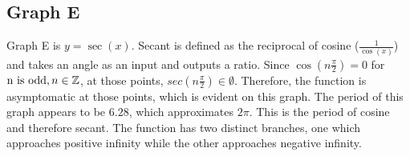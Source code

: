 \subsection{Graph E}

Graph E is $y=\sec(x)$.
Secant is defined as the reciprocal of cosine ($\frac{1}{\cos(x)}$) and takes an angle as an input and outputs a ratio.
Since ${\cos(n{\frac{\pi}{2}})=0}$ for ${\text{n is odd}, n\in \mathbb{Z}}$, at those points, ${sec(n{\frac{\pi}{2}}) {\in \emptyset}}$.
Therefore, the function is asymptomatic at those points, which is evident on this graph.
The period of this graph appears to be ${6.28}$, which approximates ${2\pi}$.
This is the period of cosine and therefore secant.
The function has two distinct branches, one which approaches positive infinity while the other approaches negative infinity.
